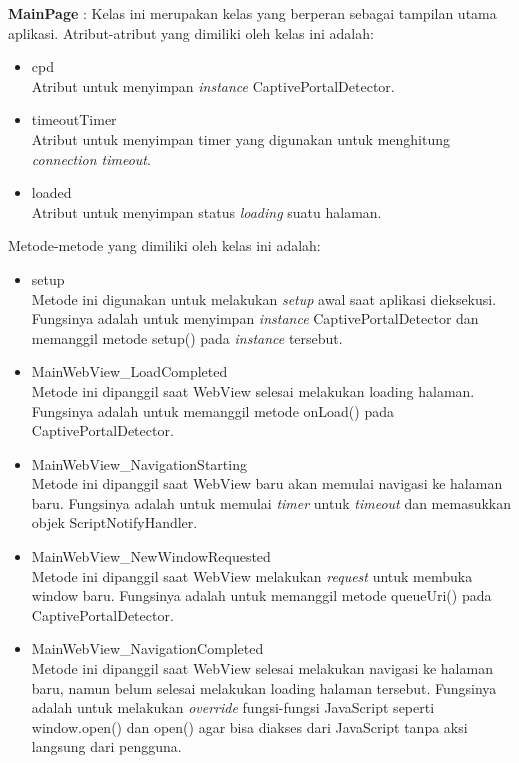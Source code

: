 \par{\textbf{MainPage} : Kelas ini merupakan kelas yang berperan sebagai tampilan utama aplikasi. Atribut-atribut yang dimiliki oleh kelas ini adalah:
    \begin{itemize}
        \item{cpd\\Atribut untuk menyimpan \textit{instance} CaptivePortalDetector.}
        \item{timeoutTimer\\Atribut untuk menyimpan timer yang digunakan untuk menghitung \textit{connection timeout}.}
        \item{loaded\\Atribut untuk menyimpan status \textit{loading} suatu halaman.}
    \end{itemize}
    Metode-metode yang dimiliki oleh kelas ini adalah:
    \begin{itemize}
        \item{setup\\Metode ini digunakan untuk melakukan \textit{setup} awal saat aplikasi dieksekusi. Fungsinya adalah untuk menyimpan \textit{instance} CaptivePortalDetector dan memanggil metode setup() pada \textit{instance} tersebut.}
        \item{MainWebView\_LoadCompleted\\Metode ini dipanggil saat WebView selesai melakukan loading halaman. Fungsinya adalah untuk memanggil metode onLoad() pada CaptivePortalDetector.}
        \item{MainWebView\_NavigationStarting\\Metode ini dipanggil saat WebView baru akan memulai navigasi ke halaman baru. Fungsinya adalah untuk memulai \textit{timer} untuk \textit{timeout} dan memasukkan objek ScriptNotifyHandler.}
        \item{MainWebView\_NewWindowRequested\\Metode ini dipanggil saat WebView melakukan \textit{request} untuk membuka window baru. Fungsinya adalah untuk memanggil metode queueUri() pada CaptivePortalDetector.}
        \item{MainWebView\_NavigationCompleted\\Metode ini dipanggil saat WebView selesai melakukan navigasi ke halaman baru, namun belum selesai melakukan loading halaman tersebut. Fungsinya adalah untuk melakukan \textit{override} fungsi-fungsi JavaScript seperti window.open() dan open() agar bisa diakses dari JavaScript tanpa aksi langsung dari pengguna.}
    \end{itemize}
}

